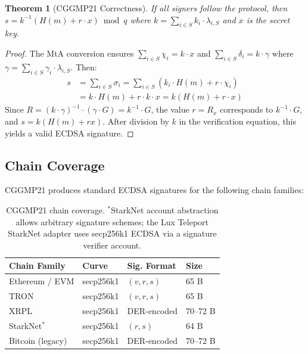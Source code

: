 \documentclass[11pt,twocolumn]{article}
\newtheorem{theorem}{Theorem}[section]
\begin{document}
\begin{theorem}[CGGMP21 Correctness]
\label{thm:cggmp-correct}
If all signers follow the protocol, then $s = k^{-1}(H(m) + r \cdot x) \bmod q$
where $k = \sum_{i \in S} k_i \cdot \lambda_{i,S}$ and $x$ is the secret key.
\end{theorem}

\begin{proof}
The MtA conversion ensures $\sum_{i \in S} \chi_i = k \cdot x$ and
$\sum_{i \in S} \delta_i = k \cdot \gamma$ where $\gamma = \sum_{i \in S} \gamma_i
\cdot \lambda_{i,S}$. Then:
\begin{align*}
s &= \sum_{i \in S} \sigma_i = \sum_{i \in S} (k_i \cdot H(m) + r \cdot \chi_i) \\
  &= k \cdot H(m) + r \cdot k \cdot x = k(H(m) + r \cdot x)
\end{align*}
Since $R = (k \cdot \gamma)^{-1} \cdot (\gamma \cdot G) = k^{-1} \cdot G$, the
value $r = R_x$ corresponds to $k^{-1} \cdot G$, and $s = k(H(m) + rx)$. After
division by $k$ in the verification equation, this yields a valid ECDSA signature.
\end{proof}

\subsection{Chain Coverage}

CGGMP21 produces standard ECDSA signatures for the following chain families:

\begin{table}[H]
\centering
\small
\begin{tabular}{@{}llll@{}}
\toprule
\textbf{Chain Family} & \textbf{Curve} & \textbf{Sig. Format} & \textbf{Size} \\
\midrule
Ethereum / EVM & secp256k1 & $(v, r, s)$ & 65 B \\
TRON & secp256k1 & $(v, r, s)$ & 65 B \\
XRPL & secp256k1 & DER-encoded & 70--72 B \\
StarkNet${}^*$ & secp256k1 & $(r, s)$ & 64 B \\
Bitcoin (legacy) & secp256k1 & DER-encoded & 70--72 B \\
\bottomrule
\end{tabular}
\caption{CGGMP21 chain coverage. ${}^*$StarkNet account abstraction allows arbitrary
signature schemes; the Lux Teleport StarkNet adapter uses secp256k1 ECDSA via a
signature verifier account.}
\label{tab:cggmp-chains}
\end{table}
\end{document}
